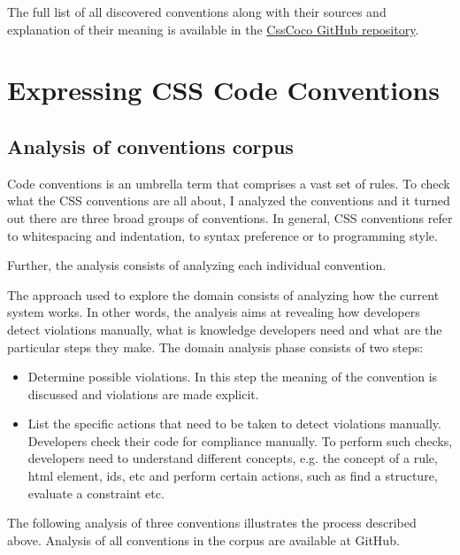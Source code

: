 \documentclass[parskip=full]{uvamscse}
\begin{document}
The full list of all discovered conventions along with their sources and explanation of their meaning is available in the \href{https://github.com/boryanagoncharenko/CssCoco/blob/master/analysis.md}{CssCoco GitHub repository}.


\chapter{Expressing CSS Code Conventions}

\section{Analysis of conventions corpus}

Code conventions is an umbrella term that comprises a vast set of rules. To check what the CSS
conventions are all about, I analyzed the conventions and it turned out there are three broad groups
of conventions. In general, CSS conventions refer to whitespacing and indentation, to syntax
preference or to programming style.

Further, the analysis consists of analyzing each individual convention.

The approach used to explore the domain consists of analyzing how the current system works. In other
words, the analysis aims at revealing how developers detect violations manually, what is knowledge
developers need and what are the particular steps they make. The domain analysis phase consists of
two steps:

  \begin{itemize}
    \item Determine possible violations. In this step the meaning of the convention is discussed and violations are made explicit.
    \item List the specific actions that need to be taken to detect violations manually. Developers check their code for compliance manually. To perform such checks, developers need to understand different concepts, e.g. the concept of a rule, html element, ids, etc and perform certain actions, such as find a structure, evaluate a constraint etc.
  \end{itemize}

The following analysis of three conventions illustrates the process described above. Analysis of all
conventions in the corpus are available at GitHub.
\end{document}
